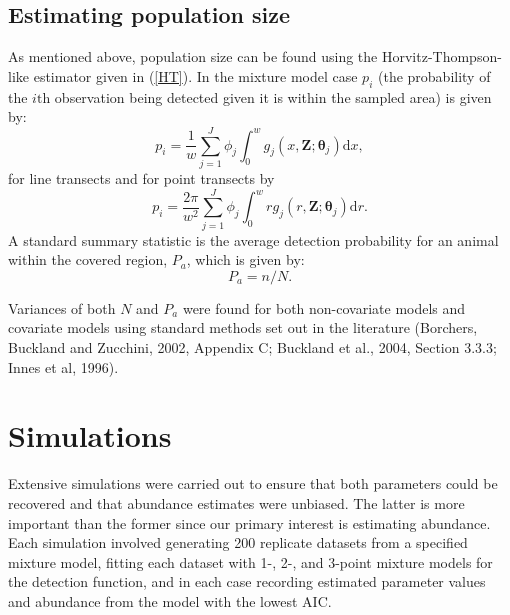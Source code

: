 \documentclass[useAMS,referee, usegraphicx]{biom}
\begin{document}
\subsection{Estimating population size}

As mentioned above, population size can be found using the Horvitz-Thompson-like estimator given in (\ref{HT}). In the mixture model case $p_i$  (the probability of the $i\text{th}$ observation being detected given it is within the sampled area) is given by:
\begin{equation*}
p_i = \frac{1}{w} \sum_{j=1}^J \phi_j \int_0^w  g_j(x,\mathbf{Z}; \bm{\theta}_j) \text{d}x,
\end{equation*}
for line transects and for point transects by
\begin{equation*}
p_i = \frac{2\pi}{w^2} \sum_{j=1}^J \phi_j \int_0^w  r g_j(r,\mathbf{Z}; \bm{\theta}_j) \text{d}r.
\end{equation*}
A standard summary statistic is the average detection probability for an animal within the covered region, $P_a$, which is given by:
\begin{equation*}
P_a = n/N.
\end{equation*}

Variances of both $N$ and $P_a$ were found for both non-covariate models and covariate models using standard methods set out in the literature (Borchers, Buckland and Zucchini, 2002, Appendix C; Buckland et al., 2004, Section 3.3.3; Innes et al, 1996).

\section{Simulations}

Extensive simulations were carried out to ensure that both parameters could be recovered and that abundance estimates were unbiased. The latter is more important than the former since our primary interest is estimating abundance. Each simulation involved generating 200 replicate datasets from a specified mixture model, fitting each dataset with 1-, 2-, and 3-point mixture models for the detection function, and in each case recording estimated parameter values and abundance from the model with the lowest AIC.
\end{document}
